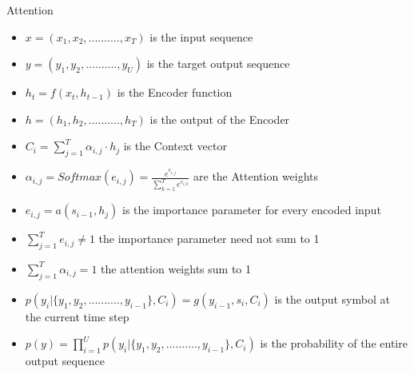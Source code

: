 \documentclass[10pt]{beamer}
\begin{document}
\begin{frame}[fragile]{Attention}
\begin{itemize}
	\item $x = (x_{1}, x_{2}, .........., x_{T})$ is the input sequence
	\item $y = (y_{1}, y_{2}, .........., y_{U})$ is the target output sequence
	\item $h_{t} = f(x_{t}, h_{t-1})$ is the Encoder function
	\item $h = (h_{1}, h_{2}, .........., h_{T})$ is the output of the Encoder
	\item $C_{i} = \sum_{j=1}^{T} \alpha_{i,j} \cdot h_{j}$ is the Context vector
	\item $\alpha_{i,j} = Softmax(e_{i,j}) = \frac{e^{e_{i,j}}}{\sum_{k=1}^{T} e^{e_{i,k}}}$ are the Attention weights
	\item $e_{i,j} = a(s_{i-1}, h_j)$ is the importance parameter for every encoded input
	\item $\sum_{j=1}^{T} e_{i,j} \neq 1$ the importance parameter need not sum to 1
	\item $\sum_{j=1}^{T} \alpha_{i,j} = 1$ the attention weights sum to 1
	\item $p(y_{i} | \{y_1, y_2, .........., y_{i-1}\}, C_{i}) = g(y_{i-1}, s_i, C_{i})$ is the output symbol at the current time step
	\item $p(y) = \prod_{i=1}^{U} p(y_i | \{y_1, y_2, .........., y_{i-1}\}, C_{i})$ is the probability of the entire output sequence
\end{itemize}

\end{frame}
\end{document}
